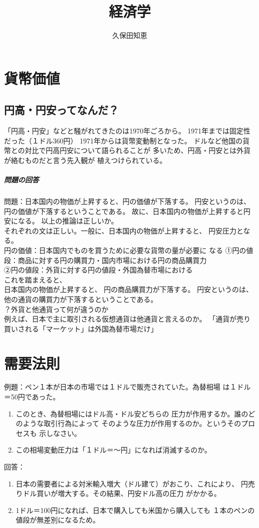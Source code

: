\documentclass{jsarticle}
\begin{document}
\title{経済学}
\author{久保田知恵}
\maketitle

\section{貨幣価値}
\subsection{円高・円安ってなんだ？}
「円高・円安」などと騒がれてきたのは1970年ごろから。
1971年までは固定性だった（１ドル360円）
1971年からは貨幣変動制となった。
ドルなど他国の貨幣との対比で円高円安について語られることが
多いため、円高・円安とは外貨が絡むものだと言う先入観が
植えつけられている。\\
\subparagraph{問題の回答}
問題：日本国内の物価が上昇すると、円の価値が下落する。
円安というのは、円の価値が下落するということである。
故に、日本国内の物価が上昇すると円安になる。
以上の推論は正しいか。\\
それぞれの文は正しい。一般に、日本国内の物価が上昇すると、
円安圧力となる。\\
円の価値：日本国内でものを買うために必要な貨幣の量が必要に
なる
①円の値段：商品に対する円の購買力・国内市場における円の商品購買力\\
②円の値段：外貨に対する円の値段・外国為替市場における\\
これを踏まえると、\\
日本国内の物価が上昇すると、
円の商品購買力が下落する。
円安というのは、他の通貨の購買力が下落するということである。\\



？外貨と他通貨って何が違うのか\\
例えば、日本で主に取引される仮想通貨は他通貨と言えるのか。
「通貨が売り買いされる「マーケット」は外国為替市場だけ」






\section{需要法則}
例題：ペン１本が日本の市場では１ドルで販売されていた。為替相場
は１ドル＝50円であった。
\begin{enumerate}
  \item このとき、為替相場にはドル高・ドル安どちらの
  圧力が作用するか。誰のどのような取引行為によって
  そのような圧力が作用するのか。というそのプロセスも
  示しなさい。
  \item この相場変動圧力は「１ドル＝〜円」になれば消滅するのか。
\end{enumerate}
回答：
\begin{enumerate}
  \item 日本の需要者による対米輸入増大（ドル建て）がおこり、これにより、
  円売りドル買いが増大する。その結果、円安ドル高の圧力
  がかかる。
  \item 1ドル＝100円になれば、日本で購入しても米国から購入しても
  １本のペンの値段が無差別になるため。

\end{enumerate}
\end{document}
